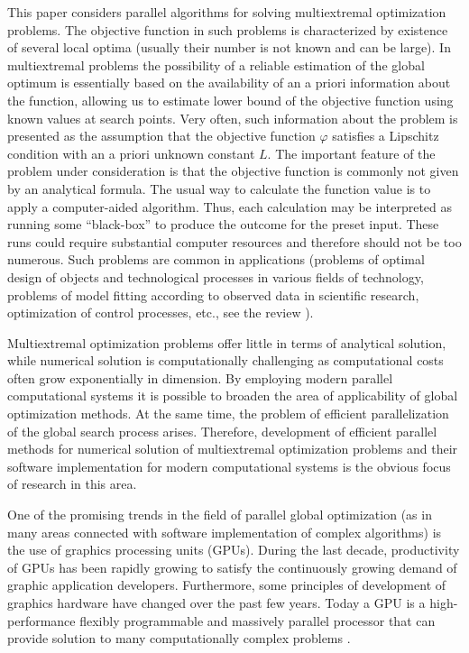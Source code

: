 \documentclass[smallcondensed]{svjour3}     %
\begin{document}
This paper considers parallel algorithms for solving multiextremal optimization problems. The objective function in such problems is characterized by existence of several local optima (usually their number is not known and can be large). 
In multiextremal problems the possibility of a reliable estimation of the global optimum is essentially based on the availability of an a priori information about the function, allowing us to estimate lower bound of the objective function using known values at search points. 
Very often, such information about the problem is presented as the assumption that the objective function $\varphi$ satisfies a Lipschitz condition with an a priori unknown constant $L$. 
The important feature of the problem under consideration is that the objective function is commonly not given by an analytical formula. The usual way to calculate the function value is to apply a computer-aided algorithm. Thus, each calculation may be interpreted as running some ``black-box'' to produce the outcome for the preset input. These runs could require substantial computer resources and therefore should not be too numerous. 
Such problems are common in applications (problems of optimal design of objects and technological processes in various fields of technology, problems of model fitting according to observed data in scientific research, optimization of control processes, etc., see the review \cite{RefPinter}).

Multiextremal optimization problems offer little in terms of analytical solution, while numerical solution is computationally challenging as computational costs often grow exponentially in dimension. By employing modern parallel computational systems it is possible to broaden the area of applicability of global optimization methods. At the same time, the problem of efficient parallelization of the global search process arises. Therefore, development of efficient parallel methods for numerical solution of multiextremal optimization problems and their software implementation for modern computational systems is the obvious focus of research in this area.

One of the promising trends in the field of parallel global optimization (as in many areas connected with software implementation of complex algorithms) is the use of graphics processing units (GPUs). During the last decade, productivity of GPUs has been rapidly growing to satisfy the continuously growing demand of graphic application developers. Furthermore, some principles of development of graphics hardware have changed over the past few years. Today a GPU is a high-performance flexibly programmable and massively parallel processor that can provide solution to many computationally complex problems \cite{RefHwu}.
\end{document}
